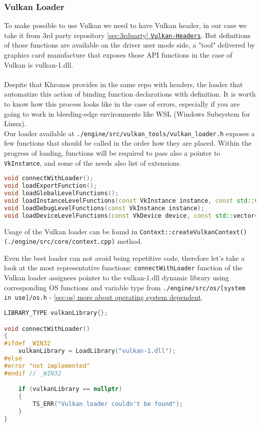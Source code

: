 \newpage
\subsubsection{Vulkan Loader}
\label{sec:vkLoader}
\hspace{\parindent}
To make possible to use Vulkan we need to have Vulkan header, in our case we take it from 3rd party repository  \hyperref[sec:3rdparty]{\ref*{sec:3rdparty} \texttt{Vulkan-Headers}}. But definitions of those functions are available on the driver user mode side, a "tool" delivered by graphics card manufacture that exposes those API functions in the case of Vulkan is vulkan-1.dll.\\\\
Despite that Khronos provides in the same repo with headers, the loader that automatize this action of binding function declarations with definition. It is worth to know how this process looks like in the case of errors, especially if you are going to work in bleeding-edge environments like WSL (Windows Subsystem for Linux).\\
Our loader available at \texttt{./engine/src/vulkan\_tools/vulkan\_loader.h} exposes a few functions that should be called in the order how they are placed. Within the progress of loading, functions will be required to pass also a pointer to \texttt{VkInstance}, and some of the needs also list of extensions.
\begin{lstlisting}[language=c++, caption=(./engine/src/vulkan\_tools/vulkan\_loader.h)]
void connectWithLoader();
void loadExportFunction();
void loadGlobalLevelFunctions();
void loadInstanceLevelFunctions(const VkInstance instance, const std::vector<std::string>& vulkanInstanceExtensions);
void loadDebugLevelFunctions(const VkInstance instance);
void loadDeviceLevelFunctions(const VkDevice device, const std::vector<std::string>& enabledVulkanDeviceExtensions);
\end{lstlisting}
Usage of the Vulkan loader can be found in \texttt{Context::createVulkanContext() (./engine/src/core/context.cpp)} method.

Even the best loader can not avoid being repetitive code, therefore let's take a look at the most representative functions:
\texttt{connectWithLoader} function of the Vulkan loader assignees pointer to the vulkan-1.dll dynamic library using corresponding OS functions and variable type from \texttt{./engine/src/os/[system in use]/os.h} -  \hyperref[sec:os]{\ref*{sec:os} more about operating system dependent}.
\begin{lstlisting}[language=c++, caption=Connecting with the Vulkan-1.dll (./engine/src/vulkan\_tools/vulkan\_loader.cpp)]
LIBRARY_TYPE vulkanLibrary{};

void connectWithLoader()
{
#ifdef _WIN32
    vulkanLibrary = LoadLibrary("vulkan-1.dll");
#else
#error "not implemented"
#endif // _WIN32

    if (vulkanLibrary == nullptr)
    {
        TS_ERR("Vulkan loader couldn't be found");
    }
}
\end{lstlisting}

